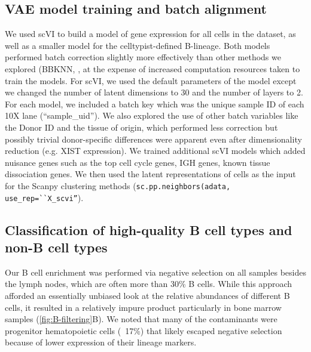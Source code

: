 \subsection{VAE model training and batch alignment} 
We used scVI\cite{lopez2018deep} to build a model of gene expression for all cells in the dataset, as well as a smaller model for the celltypist-defined B-lineage. Both models performed batch correction slightly more effectively than other methods we explored (BBKNN, \cite{polanski2020bbknn}, at the expense of increased computation resources taken to train the models. For scVI, we used the default parameters of the model except we changed the number of latent dimensions to 30 and the number of layers to 2. For each model, we included a batch key which was the unique sample ID of each 10X lane (``sample\_uid''). We also explored the use of other batch variables like the Donor ID and the tissue of origin, which performed less correction but possibly trivial donor-specific differences were apparent even after dimensionality reduction (e.g. XIST expression). We trained additional scVI models which added nuisance genes such as the top cell cycle genes, IGH genes, known tissue dissociation genes. We then used the latent representations of cells as the input for the Scanpy clustering methods (\verb|sc.pp.neighbors(adata, use_rep=``X_scvi”|). 

\subsection{Classification of high-quality B cell types and non-B cell types}
Our B cell enrichment was performed via negative selection on all samples besides the lymph nodes, which are often more than 30\% B cells. While this approach afforded an essentially unbiased look at the relative abundances of different B cells, it resulted in a relatively impure product particularly in bone marrow samples (\ref{fig:B-filtering}B). We noted that many of the contaminants were progenitor hematopoietic cells (~17\%) that likely escaped negative selection because of lower expression of their lineage markers. 

